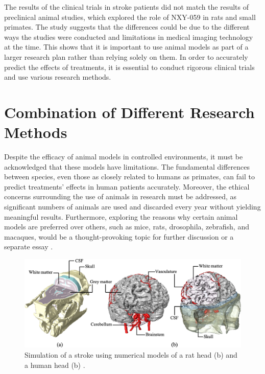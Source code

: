 \documentclass[10pt]{article}
\begin{document}
\begin{sloppypar}
  The results of the clinical trials in stroke patients did not match the results of preclinical animal studies, which explored the role of NXY-059 in rats and small primates. The study suggests that the differences could be due to the different ways the studies were conducted and limitations in medical imaging technology at the time. This shows that it is important to use animal models as part of a larger research plan rather than relying solely on them. In order to accurately predict the effects of treatments, it is essential to conduct rigorous clinical trials and use various research methods.

  \section{Combination of Different Research Methods}
  \label{sec:discussion}

  Despite the efficacy of animal models in controlled environments, it must be acknowledged that these models have limitations. The fundamental differences between species, even those as closely related to humans as primates, can fail to predict treatments’ effects in human patients accurately. Moreover, the ethical concerns surrounding the use of animals in research must be addressed, as significant numbers of animals are used and discarded every year without yielding meaningful results. Furthermore, exploring the reasons why certain animal models are preferred over others, such as mice, rats, drosophila, zebrafish, and macaques, would be a thought-provoking topic for further discussion or a separate essay \citep{govuk_statistics_2022}.

  \vspace{10pt} %
  \begin{figure}[ht]
    \centering
    \includegraphics[width=\textwidth]{figures/in-silico.jpg}
    \caption[Simulation of a stroke using numerical models of a rat head and a human head]{Simulation of a stroke using numerical models of a rat head (b) and a human head (b) \citep{bing_medical_2020}.}
    \label{fig:silico}
  \end{figure}


\end{sloppypar}
\end{document}
